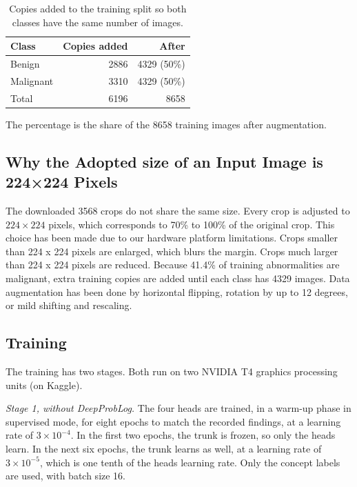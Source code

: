 \begin{table}[!t]
\caption{Copies added to the training split so both classes have the same number of images.}
\label{tab:augmentation}
\centering
\footnotesize
\begin{tabular}{@{}lrr@{}}
\toprule
Class & Copies added & After \\
\midrule
Benign & 2886 & 4329 (50\%) \\
Malignant & 3310 & 4329 (50\%) \\
\midrule
Total & 6196 & 8658 \\
\bottomrule
\end{tabular}

\vspace{0.4em}
\begin{minipage}{\columnwidth}
\footnotesize
The percentage is the share of the 8658 training images after augmentation.
\end{minipage}
\end{table}

\subsection{Why the Adopted size of an Input Image is 224×224 Pixels}
\label{sec:resolution}

The downloaded 3568 crops do not share the same size. Every crop is adjusted to $224\times 224$ pixels, which corresponds to 70\% to 100\% of the original crop. This choice has been made due to our hardware platform limitations. Crops smaller than 224 x 224 pixels are enlarged, which blurs the margin. Crops much larger than 224 x 224  pixels are reduced. Because 41.4\% of training abnormalities are malignant, extra training copies are added until each class has 4329 images. Data augmentation has been done by horizontal flipping, rotation by up to 12 degrees, or mild shifting and rescaling.


\subsection{Training}
\label{sec:neural}

The training has two stages. Both run on two NVIDIA T4 graphics processing units (on Kaggle).

\textit{Stage 1, without DeepProbLog.} The  four heads are trained, in a warm-up phase in supervised mode, for eight epochs to match the recorded findings, at a learning rate of $3\times10^{-4}$. In the first two epochs, the trunk is frozen, so only the heads learn. In the next six epochs, the trunk learns as well, at a learning rate of $3\times10^{-5}$, which is one tenth of the heads learning rate. Only the concept labels are used, with batch size 16. 

